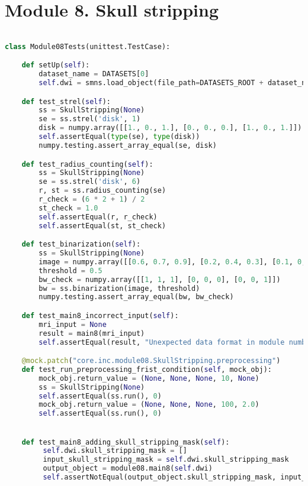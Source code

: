 \section{Module 8. Skull stripping}

 \begin{lstlisting}[language=Python, caption = Implemented tests.]

class Module08Tests(unittest.TestCase):

    def setUp(self):
        dataset_name = DATASETS[0]
        self.dwi = smns.load_object(file_path=DATASETS_ROOT + dataset_name)

    def test_strel(self):
        ss = SkullStripping(None)
        se = ss.strel('disk', 1)
        disk = numpy.array([[1., 0., 1.], [0., 0., 0.], [1., 0., 1.]])
        self.assertEqual(type(se), type(disk))
        numpy.testing.assert_array_equal(se, disk)

    def test_radius_counting(self):
        ss = SkullStripping(None)
        se = ss.strel('disk', 6)
        r, st = ss.radius_counting(se)
        r_check = (6 * 2 + 1) / 2
        st_check = 1.0
        self.assertEqual(r, r_check)
        self.assertEqual(st, st_check)

    def test_binarization(self):
        ss = SkullStripping(None)
        image = numpy.array([[0.6, 0.7, 0.9], [0.2, 0.4, 0.3], [0.1, 0, 0.8]])
        threshold = 0.5
        bw_check = numpy.array([[1, 1, 1], [0, 0, 0], [0, 0, 1]])
        bw = ss.binarization(image, threshold)
        numpy.testing.assert_array_equal(bw, bw_check)

    def test_main8_incorrect_input(self):
        mri_input = None
        result = main8(mri_input)
        self.assertEqual(result, "Unexpected data format in module number 8!")

    @mock.patch("core.inc.module08.SkullStripping.preprocessing")
    def test_run_preprocessing_frist_condition(self, mock_obj):
        mock_obj.return_value = (None, None, None, 10, None)
        ss = SkullStripping(None)
        self.assertEqual(ss.run(), 0)
        mock_obj.return_value = (None, None, None, 100, 2.0)
        self.assertEqual(ss.run(), 0)


    def test_main8_adding_skull_stripping_mask(self):
         self.dwi.skull_stripping_mask = []
         input_skull_stripping_mask = self.dwi.skull_stripping_mask
         output_object = module08.main8(self.dwi)
         self.assertNotEqual(output_object.skull_stripping_mask, input_skull_stripping_mask)


\end{lstlisting}
